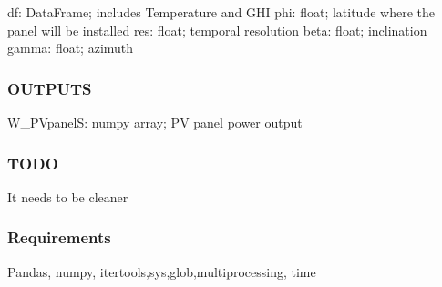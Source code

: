 df\+: Data\+Frame; includes Temperature and G\+HI phi\+: float; latitude where the panel will be installed res\+: float; temporal resolution beta\+: float; inclination gamma\+: float; azimuth \subsubsection*{O\+U\+T\+P\+U\+TS }

W\+\_\+\+P\+VpanelS\+: numpy array; PV panel power output \subsubsection*{T\+O\+DO }

It needs to be cleaner \subsubsection*{Requirements }

Pandas, numpy, itertools,sys,glob,multiprocessing, time 